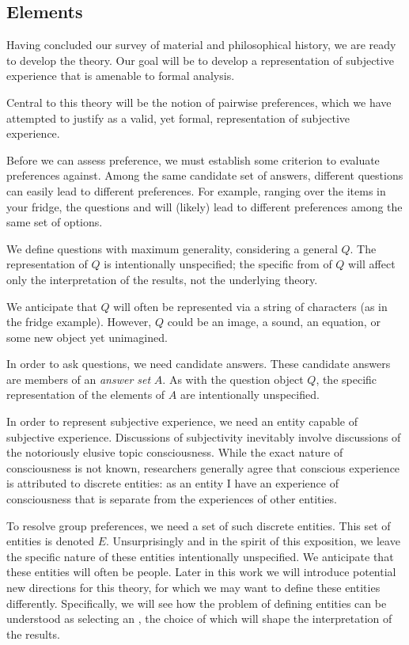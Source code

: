 
\subsection{Elements}

Having concluded our survey of material and philosophical history, we are ready to develop the theory.
Our goal will be to develop a representation of subjective experience that is amenable to formal analysis.

Central to this theory will be the notion of pairwise preferences, which we have attempted to justify as a valid, yet formal, representation of subjective experience.

Before we can assess preference, we must establish some criterion to evaluate preferences against.
Among the same candidate set of answers, different questions can easily lead to different preferences.
For example, ranging over the items in your fridge, the questions  and  will (likely) lead to different preferences among the same set of options.

\bigskip

We define questions with maximum generality, considering a general  $Q$.
The representation of $Q$ is intentionally unspecified; the specific from of $Q$ will affect only the interpretation of the results, not the underlying theory.

We anticipate that $Q$ will often be represented via a string of characters (as in the fridge example).
However, $Q$ could be an image, a sound, an equation, or some new object yet unimagined.

\bigskip

In order to ask questions, we need candidate answers.
These candidate answers are members of an \textit{answer set} $A$.
As with the question object $Q$, the specific representation of the elements of $A$ are intentionally unspecified.

\bigskip

In order to represent subjective experience, we need an entity capable of subjective experience.
Discussions of subjectivity inevitably involve discussions of the notoriously elusive topic consciousness.
While the exact nature of consciousness is not known, researchers generally agree that conscious experience is attributed to discrete entities: as an entity I have an experience of consciousness that is separate from the experiences of other entities.
 
To resolve group preferences, we need a set of such discrete entities.
This set of entities is denoted $E$.
Unsurprisingly and in the spirit of this exposition, we leave the specific nature of these entities intentionally unspecified.
We anticipate that these entities will often be people. Later in this work we will introduce potential new directions for this theory, for which we may want to define these entities differently. Specifically, we will see how the problem of defining entities can be understood as selecting an , the choice of which will shape the interpretation of the results.

